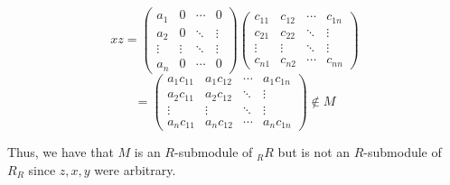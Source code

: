 \begin{solution}
    $$xz=\left(\begin{array}{cccc} a_1 & 0 & \cdots & 0 \\ a_2 & 0 & \ddots & \vdots
                                \\ \vdots & \vdots & \ddots & \vdots \\ a_n & 0 & \cdots & 0
         \end{array}\right)
         \left(\begin{array}{cccc} c_{11} & c_{12} & \cdots & c_{1n}\\ c_{21} & c_{22} & \ddots & \vdots
                                \\ \vdots & \vdots & \ddots & \vdots\\ c_{n1} & c_{n2} & \cdots & c_{nn}
        \end{array}\right)$$
    $$=\left(\begin{array}{cccc} a_1c_{11} & a_1c_{12} & \cdots & a_1c_{1n}
                              \\ a_2c_{11} & a_2c_{12} & \ddots & \vdots
                              \\ \vdots & \vdots & \ddots & \vdots
                              \\ a_nc_{11} & a_nc_{12} & \cdots & a_nc_{1n} \end{array}\right)\notin M$$
    
    Thus, we have that $M$ is an $R$-submodule of $ _RR$ but is not an $R$-submodule of $R_R$ since
    $z,x,y$ were arbitrary.


\end{solution}